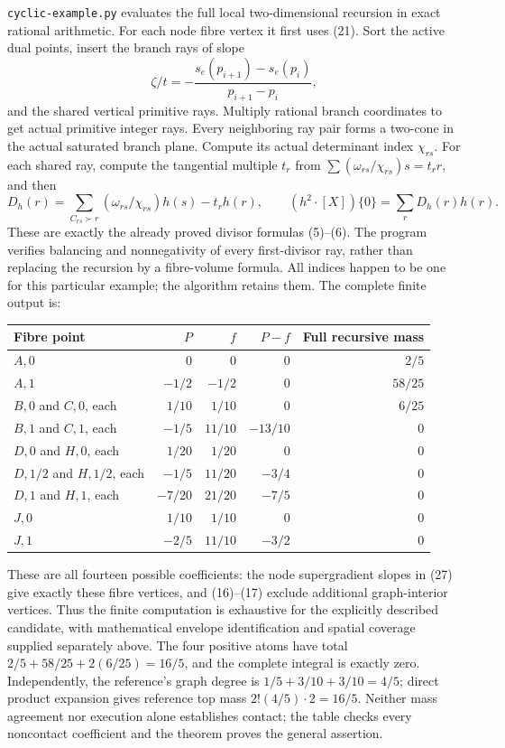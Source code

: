 \documentclass[
  11pt,
]{article}
\begin{document}
\texttt{cyclic-example.py} evaluates the full local two-dimensional
recursion in exact rational arithmetic. For each node fibre vertex it
first uses (21). Sort the active dual points, insert the branch rays of
slope \[
 \zeta/t=-\frac{s_e(p_{i+1})-s_e(p_i)}{p_{i+1}-p_i},
\] and the shared vertical primitive rays. Multiply rational branch
coordinates to get actual primitive integer rays. Every neighboring ray
pair forms a two-cone in the actual saturated branch plane. Compute its
actual determinant index \(\chi_{rs}\). For each shared ray, compute the
tangential multiple \(t_r\) from \(\sum(\omega_{rs}/\chi_{rs})s=t_rr\),
and then \[
 D_h(r)=\sum_{C_{rs}\succ r}(\omega_{rs}/\chi_{rs})h(s)-t_rh(r),\qquad
                         (h^2\cdot[X])\{0\}=\sum_r D_h(r)h(r).            \tag{28}
\] These are exactly the already proved divisor formulas (5)--(6). The
program verifies balancing and nonnegativity of every first-divisor ray,
rather than replacing the recursion by a fibre-volume formula. All
indices happen to be one for this particular example; the algorithm
retains them. The complete finite output is:

\begin{longtable}[]{@{}lrrrr@{}}
\toprule\noalign{}
Fibre point & \(P\) & \(f\) & \(P-f\) & Full recursive mass \\
\midrule\noalign{}
\endhead
\bottomrule\noalign{}
\endlastfoot
\(A,0\) & 0 & 0 & 0 & \(2/5\) \\
\(A,1\) & \(-1/2\) & \(-1/2\) & 0 & \(58/25\) \\
\(B,0\) and \(C,0\), each & \(1/10\) & \(1/10\) & 0 & \(6/25\) \\
\(B,1\) and \(C,1\), each & \(-1/5\) & \(11/10\) & \(-13/10\) & 0 \\
\(D,0\) and \(H,0\), each & \(1/20\) & \(1/20\) & 0 & 0 \\
\(D,1/2\) and \(H,1/2\), each & \(-1/5\) & \(11/20\) & \(-3/4\) & 0 \\
\(D,1\) and \(H,1\), each & \(-7/20\) & \(21/20\) & \(-7/5\) & 0 \\
\(J,0\) & \(1/10\) & \(1/10\) & 0 & 0 \\
\(J,1\) & \(-2/5\) & \(11/10\) & \(-3/2\) & 0 \\
\end{longtable}

These are all fourteen possible coefficients: the node supergradient
slopes in (27) give exactly these fibre vertices, and (16)--(17) exclude
additional graph-interior vertices. Thus the finite computation is
exhaustive for the explicitly described candidate, with mathematical
envelope identification and spatial coverage supplied separately above.
The four positive atoms have total \(2/5+58/25+2(6/25)=16/5\), and the
complete integral is exactly zero. Independently, the reference's graph
degree is \(1/5+3/10+3/10=4/5\); direct product expansion gives
reference top mass \(2!(4/5)\cdot2=16/5\). Neither mass agreement nor
execution alone establishes contact; the table checks every noncontact
coefficient and the theorem proves the general assertion.
\end{document}

